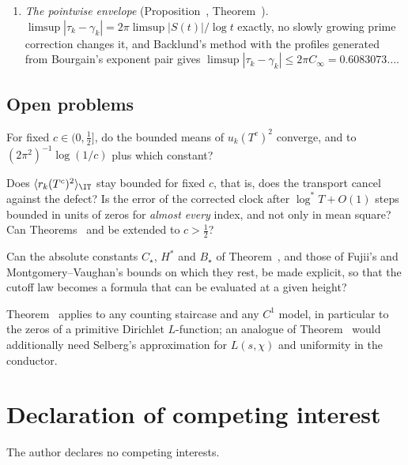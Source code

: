 \begin{sloppypar}
\begin{enumerate}[leftmargin=1.6em]
\item \emph{The pointwise envelope} (Proposition~, Theorem~). $\limsup|\tau_k-\gamma_k|=2\pi\limsup|S(t)|/\log t$ exactly, no slowly growing prime correction changes it, and Backlund's method with the profiles generated from Bourgain's exponent pair gives $\limsup|\tau_k-\gamma_k|\le2\pi C_\infty=0.6083073\ldots$.
\end{enumerate}
\end{sloppypar}

\subsection{Open problems}
\begin{question}\label{q:constant}
For fixed $c\in(0,\frac12]$, do the bounded means of $u_k(T^c)^2$ converge, and to $(2\pi^2)^{-1}\log(1/c)$ plus which constant?
\end{question}

\begin{question}\label{q:fixed_c}
Does $\langle r_k(T^c)^2\rangle_{\IT}$ stay bounded for fixed $c$, that is, does the transport cancel against the defect? Is the error of the corrected clock after $\log^*T+O(1)$ steps bounded in units of zeros for \emph{almost every} index, and not only in mean square? Can Theorems~ and  be extended to $c>\frac12$?
\end{question}

\begin{question}\label{q:explicit}
Can the absolute constants $C_\star$, $H^*$ and $B_\star$ of Theorem~, and those of Fujii's and Montgomery--Vaughan's bounds on which they rest, be made explicit, so that the cutoff law  becomes a formula that can be evaluated at a given height?
\end{question}

Theorem~ applies to any counting staircase and any $C^1$ model, in particular to the zeros of a primitive Dirichlet $L$-function; an analogue of Theorem~ would additionally need Selberg's approximation for $L(s,\chi)$ \cite{Selberg1946b,Fujii1974} and uniformity in the conductor.

\section*{Declaration of competing interest}
The author declares no competing interests.

